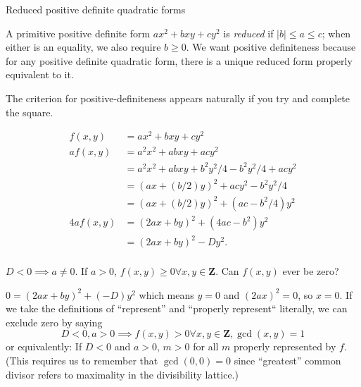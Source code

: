 Reduced positive definite quadratic forms

A primitive positive definite form $ax^2+bxy+cy^2$ is \emph{reduced} if $|b|\leq a\leq c$; when either is an equality, we also require $b\geq 0$. We want positive definiteness because for any positive definite quadratic form, there is a unique reduced form properly equivalent to it.

The criterion for positive-definiteness appears naturally if you try and complete the square.

\begin{align*}
  f(x,y) &= ax^2 + bxy + cy^2\\
 af(x,y) &= a^2x^2 + abxy + acy^2\\
         &= a^2x^2 + abxy + b^2y^2/4 - b^2y^2/4 + acy^2\\
         &= (ax + (b/2)y)^2 + acy^2-b^2y^2/4\\
         &= (ax + (b/2)y)^2 + (ac-b^2/4)y^2\\
4af(x,y) &= (2ax+by)^2 + (4ac-b^2)y^2\\
         &= (2ax+by)^2 - Dy^2.\\
\end{align*}

$D<0\implies a\neq 0$. If $a>0$, $f(x,y)\geq 0\forall x,y\in\mathbf{Z}$. Can $f(x,y)$ ever be zero?

$0 = (2ax+by)^2 + (-D)y^2$
which means $y=0$ and $(2ax)^2 = 0$, so $x=0$. If we take the definitions of ``represent'' and ``properly represent`` literally, we can exclude zero by saying
\[D<0, a>0\implies f(x,y) > 0\forall x,y\in\mathbf{Z}, \gcd(x,y)=1\]
or equivalently: If $D<0$ and $a>0$, $m>0$ for all $m$ properly represented by $f$. (This requires us to remember that $\gcd(0,0)=0$ since ``greatest'' common divisor refers to maximality in the divisibility lattice.)

